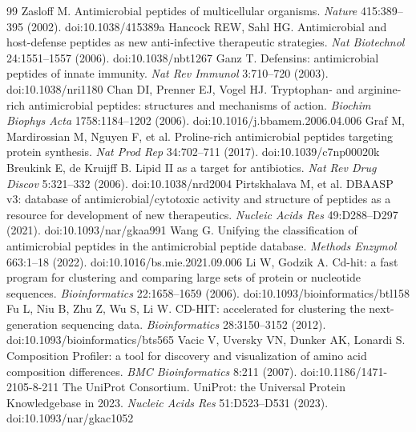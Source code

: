 \documentclass[11pt,a4paper]{article}
\begin{document}
\begin{thebibliography}{99}\small
{} Zasloff M. Antimicrobial peptides of multicellular organisms. \emph{Nature} 415:389--395 (2002). doi:10.1038/415389a
 Hancock REW, Sahl HG. Antimicrobial and host-defense peptides as new anti-infective therapeutic strategies. \emph{Nat Biotechnol} 24:1551--1557 (2006). doi:10.1038/nbt1267
 Ganz T. Defensins: antimicrobial peptides of innate immunity. \emph{Nat Rev Immunol} 3:710--720 (2003). doi:10.1038/nri1180
 Chan DI, Prenner EJ, Vogel HJ. Tryptophan- and arginine-rich antimicrobial peptides: structures and mechanisms of action. \emph{Biochim Biophys Acta} 1758:1184--1202 (2006). doi:10.1016/j.bbamem.2006.04.006
 Graf M, Mardirossian M, Nguyen F, et al. Proline-rich antimicrobial peptides targeting protein synthesis. \emph{Nat Prod Rep} 34:702--711 (2017). doi:10.1039/c7np00020k
 Breukink E, de Kruijff B. Lipid II as a target for antibiotics. \emph{Nat Rev Drug Discov} 5:321--332 (2006). doi:10.1038/nrd2004
 Pirtskhalava M, et al. DBAASP v3: database of antimicrobial/cytotoxic activity and structure of peptides as a resource for development of new therapeutics. \emph{Nucleic Acids Res} 49:D288--D297 (2021). doi:10.1093/nar/gkaa991
 Wang G. Unifying the classification of antimicrobial peptides in the antimicrobial peptide database. \emph{Methods Enzymol} 663:1--18 (2022). doi:10.1016/bs.mie.2021.09.006
 Li W, Godzik A. Cd-hit: a fast program for clustering and comparing large sets of protein or nucleotide sequences. \emph{Bioinformatics} 22:1658--1659 (2006). doi:10.1093/bioinformatics/btl158
 Fu L, Niu B, Zhu Z, Wu S, Li W. CD-HIT: accelerated for clustering the next-generation sequencing data. \emph{Bioinformatics} 28:3150--3152 (2012). doi:10.1093/bioinformatics/bts565
 Vacic V, Uversky VN, Dunker AK, Lonardi S. Composition Profiler: a tool for discovery and visualization of amino acid composition differences. \emph{BMC Bioinformatics} 8:211 (2007). doi:10.1186/1471-2105-8-211
 The UniProt Consortium. UniProt: the Universal Protein Knowledgebase in 2023. \emph{Nucleic Acids Res} 51:D523--D531 (2023). doi:10.1093/nar/gkac1052
\end{thebibliography}
\end{document}
